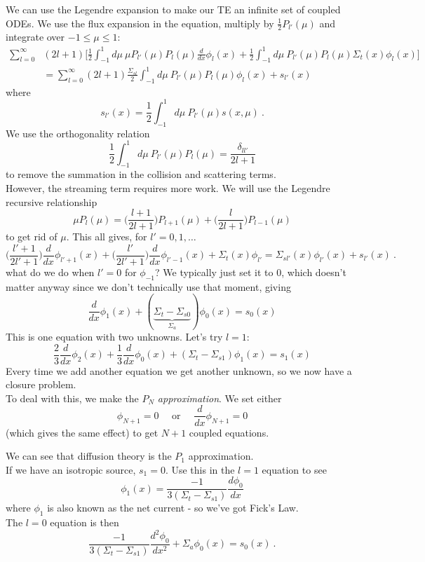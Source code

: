 \documentclass[12pt]{article}
\begin{document}
We can use the Legendre expansion to make our TE an infinite set of coupled ODEs. We use the flux expansion in the equation, multiply by $\frac{1}{2}P_{l'}(\mu)$ and integrate over $-1 \leq \mu \leq 1$:
\begin{align*}
\sum_{l=0}^{\infty} &(2l+1)\biggl[ \frac{1}{2} \int_{-1}^1 d\mu\: \mu P_{l'}(\mu) P_l(\mu) \frac{d}{d x}\phi_l(x) + \frac{1}{2} \int_{-1}^1 d\mu\: P_{l'}(\mu) P_l(\mu) \Sigma_t(x)\phi_l(x) \biggr] \\
&= \sum_{l=0}^{\infty} (2l+1)\frac{\Sigma_{sl}}{2}\int_{-1}^1 d\mu\: P_{l'}(\mu) P_l(\mu) \phi_l(x) + s_{l'}(x)
\end{align*}
where
\[
s_{l'}(x) = \frac{1}{2} \int_{-1}^1 d\mu\:P_{l'}(\mu) s(x,\mu)\:.
\]
We use the orthogonality relation
\[
\frac{1}{2} \int_{-1}^1 d\mu\: P_{l'}(\mu) P_l(\mu) = \frac{\delta_{l l'}}{2l+1}
\]
to remove the summation in the collision and scattering terms. \\
However, the streaming term requires more work. We will use the Legendre recursive relationship
\[
\mu P_l(\mu) = \bigl(\frac{l+1}{2l+1}\bigr)P_{l+1}(\mu) + \bigl(\frac{l}{2l+1}\bigr)P_{l-1}(\mu)
\]
to get rid of $\mu$. This all gives, for $l' = 0, 1, \dots$
\[
\bigl(\frac{l'+1}{2l'+1}\bigr)\frac{d}{d x}\phi_{l'+1}(x) + \bigl(\frac{l'}{2l'+1}\bigr)\frac{d}{d x}\phi_{l'-1}(x) + \Sigma_t(x) \phi_{l'} = \Sigma_{sl'}(x)\phi_{l'}(x) + s_{l'}(x)\:.
\]
what do we do when $l'=0$ for $\phi_{-1}$? We typically just set it to $0$, which doesn't matter anyway since we don't technically use that moment, giving
\[
\frac{d}{dx}\phi_1(x) + (\underbrace{\Sigma_t - \Sigma_{s0}}_{\Sigma_a})\phi_0(x) = s_0(x)
\]
This is one equation with two unknowns. Let's try $l=1$:
\[
\frac{2}{3}\frac{d}{dx}\phi_2(x) + \frac{1}{3}\frac{d}{dx}\phi_0(x) + (\Sigma_t - \Sigma_{s1})\phi_1(x) = s_1(x)
\]
Every time we add another equation we get another unknown, so we now have a closure problem.\\
To deal with this, we make the $P_N$ \textit{approximation}. We set either 
\[\phi_{N+1} = 0 \quad\text{ or }\quad\frac{d}{dx}\phi_{N+1}=0
\]
(which gives the same effect) to get $N+1$ coupled equations. 

We can see that diffusion theory is the $P_1$ approximation.\\
If we have an isotropic source, $s_1=0$. Use this in the $l=1$ equation to see
\[
\phi_1(x) = \frac{-1}{3(\Sigma_t - \Sigma_{s1})}\frac{d \phi_0}{dx}
\]
where $\phi_1$ is also known as the net current - so we've got Fick's Law.\\
The $l=0$ equation is then
\[
\frac{-1}{3(\Sigma_t - \Sigma_{s1})}\frac{d^2 \phi_0}{dx^2} + \Sigma_a \phi_0(x) = s_0(x)\:.
\]
\end{document}

